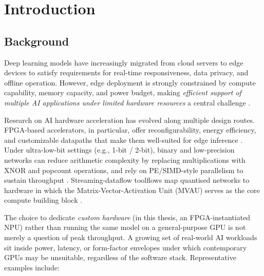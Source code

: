 \documentclass[12pt, a4paper]{report}
\numberwithin{equation}{chapter}
\numberwithin{figure}{chapter}
\numberwithin{table}{chapter}
\numberwithin{algorithm}{chapter}
\begin{document}
\chapter{Introduction}

\section{Background}

Deep learning models have increasingly migrated from cloud servers to edge devices to satisfy requirements for real-time responsiveness, data privacy, and offline operation. However, edge deployment is strongly constrained by compute capability, memory capacity, and power budget, making \emph{efficient support of multiple AI applications under limited hardware resources} a central challenge \cite{Gao2025CNNFPGA, Antunes2025SpaceSurvey, Nechi2023FPGADLSurvey}.

Research on AI hardware acceleration has evolved along multiple design routes. FPGA-based accelerators, in particular, offer reconfigurability, energy efficiency, and customizable datapaths that make them well-suited for edge inference \cite{Jiang2025FPGACNNReview, Li2025DataflowTiling}. Under ultra-low-bit settings (e.g., 1-bit / 2-bit), binary and low-precision networks can reduce arithmetic complexity by replacing multiplications with XNOR and popcount operations, and rely on PE/SIMD-style parallelism to sustain throughput \cite{Rastegari2016XNOR, Hubara2016BinarizedNN, Qin2020BNNSurvey}. Streaming-dataflow toolflows map quantised networks to hardware in which the Matrix-Vector-Activation Unit (MVAU) serves as the core compute building block \cite{Umuroglu2017FINN, Blott2018FINNR, Alam2023RTLMVU}.

The choice to dedicate \emph{custom hardware} (in this thesis, an FPGA-instantiated NPU) rather than running the same model on a general-purpose GPU is not merely a question of peak throughput. A growing set of real-world AI workloads sit inside power, latency, or form-factor envelopes under which contemporary GPUs may be unsuitable, regardless of the software stack. Representative examples include:
\end{document}
